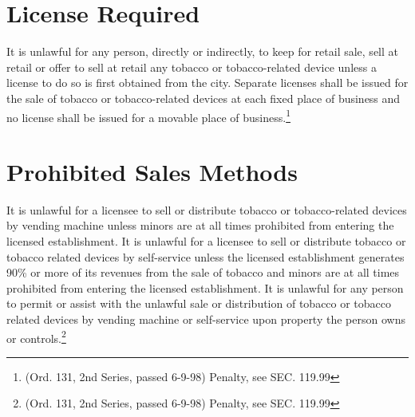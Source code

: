 \section{License Required}
It is unlawful for any person, directly or indirectly, to keep for retail sale, sell at retail or offer to sell at retail any tobacco or tobacco-related device unless a license to do so is first obtained from the city.  Separate licenses shall be issued for the sale of tobacco or tobacco-related devices at each fixed place of business and no license shall be issued for a movable place of business.\footnote{(Ord. 131, 2nd Series, passed 6-9-98)  Penalty, see SEC. 119.99}

\section{Prohibited Sales Methods}
It is unlawful for a licensee to sell or distribute tobacco or tobacco-related devices by vending machine unless minors are at all times prohibited from entering the licensed establishment.  It is unlawful for a licensee to sell or distribute tobacco or tobacco related devices by self-service unless the licensed establishment generates 90\% or more of its revenues from the sale of tobacco and minors are at all times prohibited from entering the licensed establishment.  It is unlawful for any person to permit or assist with the unlawful sale or distribution of tobacco or tobacco related devices by vending machine or self-service upon property the person owns or controls.\footnote{(Ord. 131, 2nd Series, passed 6-9-98)  Penalty, see SEC. 119.99}

